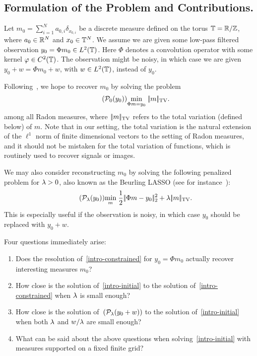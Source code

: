 
\subsection{Formulation of the Problem and Contributions.}

Let $m_0=\sum_{i=1}^N a_{0,i}\delta_{x_{0,i}}$ be a discrete measure defined on the torus $\mathbb{T}=\mathbb{R}/\mathbb{Z}$, where $a_0 \in \mathbb{R}^N$ and $x_0 \in \mathbb{T}^N$. We assume we are given some low-pass filtered observation $y_0=\Phi m_0 \in L^2(\mathbb{T})$. Here $\Phi$ denotes a convolution operator with some kernel $\varphi \in C^2(\mathbb{T})$. The observation might be noisy, in which case we are given $y_0+w= \Phi m_0 + w$, with $w\in L^2(\mathbb{T})$, instead of $y_0$.

Following~\cite{Candes-toward,deCastro-beurling}, we hope to recover $m_0$ by solving the problem
\begin{align}\tag{$\Pp_0(y_0)$}
	\umin{\Phi m=y_0} \normTV{m}.
\label{intro-constrained}
\end{align}
among all Radon measures, where $|\!| m |\!|_{\text{\upshape TV}}$ refers to the total variation (defined below) of $m$. Note that in our setting, the total variation is the natural extension of the $\ell^1$ norm of finite dimensional vectors to the setting of Radon measures, and it should not be mistaken for the total variation of functions, which is routinely used to recover signals or images.

We may also consider reconstructing $m_0$ by solving the following penalized problem for $\lambda >0$, also known as the Beurling LASSO (see for instance~\cite{Azais-inaccurate}):
\begin{align*}\tag{$\Pp_\la(y_0)$}
	\umin{m} \frac{1}{2} \norm{\Phi m - y_0}_2^2 + \la \normTV{m}.
\label{intro-initial}
\end{align*}
This is especially useful if the observation is noisy, in which case $y_0$ should be replaced with $y_0+w$.

Four questions immediately arise:
\begin{enumerate}
	\item Does the resolution of~\eqref{intro-constrained} for $y_0=\Phi m_0$ actually recover interesting measures $m_0$?
	\item How close is the solution of~\eqref{intro-initial} to the solution of~\eqref{intro-constrained} when $\lambda$ is small enough? 
	\item How close is the solution of~$(\mathcal{P}_\lambda(y_0+w))$ to the solution of~\eqref{intro-initial} when both $\lambda$ and $w/\lambda$ are small enough? 
	\item What can be said about the above questions when solving~\eqref{intro-initial} with measures supported on a fixed finite grid? 
\end{enumerate}

